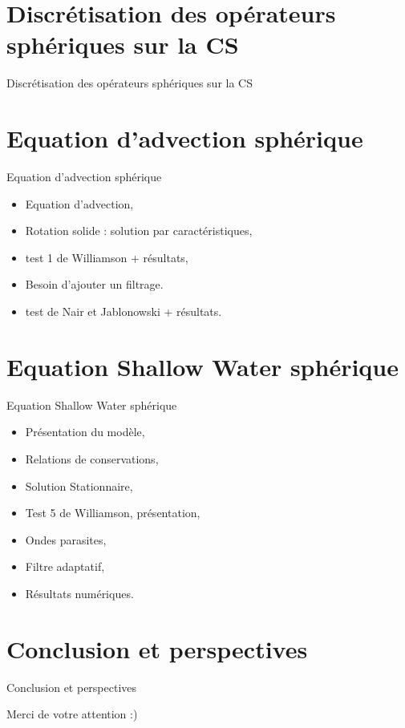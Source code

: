 \documentclass[11pt]{beamer}
\begin{document}
\begin{frame}
\tableofcontents
\end{frame}

\section{Discrétisation des opérateurs sphériques sur la CS}
\begin{frame}{Discrétisation des opérateurs sphériques sur la CS}





\end{frame}

\section{Equation d'advection sphérique}
\begin{frame}{Equation d'advection sphérique}
\begin{itemize}
\item Equation d'advection,
\item Rotation solide : solution par caractéristiques,
\item test 1 de Williamson + résultats,
\item Besoin d'ajouter un filtrage.
\item test de Nair et Jablonowski + résultats.
\end{itemize}
\end{frame}

\section{Equation Shallow Water sphérique}
\begin{frame}{Equation Shallow Water sphérique}
\begin{itemize}
\item Présentation du modèle,
\item Relations de conservations,
\item Solution Stationnaire,
\item Test 5 de Williamson, présentation,
\item Ondes parasites,
\item Filtre adaptatif,
\item Résultats numériques.
\end{itemize}
\end{frame}


\section*{Conclusion et perspectives}
\begin{frame}{Conclusion et perspectives}

\end{frame}

\begin{frame}
\begin{center}
Merci de votre attention :)
\end{center}
\end{frame}
\end{document}
